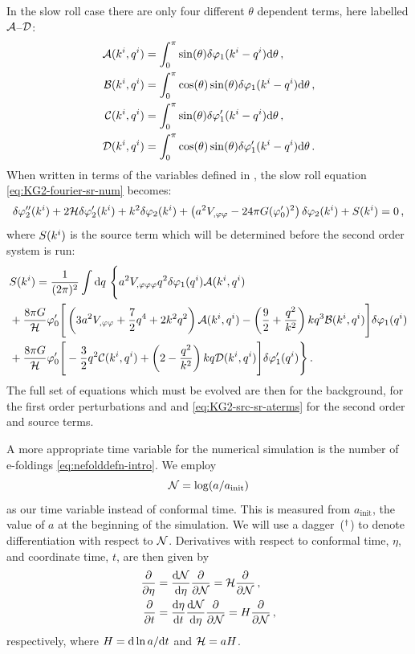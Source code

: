 In the slow roll case there are only four different $\theta$ dependent terms,
here labelled $\mathcal{A}$--$\mathcal{D}$:
%
\begin{align}
\label{eq:AtoD-num}
 \mathcal{A}(k^i,q^i) &= \int_0^\pi \sin(\theta) \delta\varphi_{1}(k^i-q^i) \mathrm{d}\theta \,,
\nonumber\\
 \mathcal{B}(k^i,q^i) &= \int_0^\pi \cos(\theta)\sin(\theta) \delta\varphi_{1}(k^i-q^i)
\mathrm{d}\theta \,,\nonumber\\
 \mathcal{C}(k^i,q^i) &= \int_0^\pi \sin(\theta) \delta\varphi_{1}'(k^i-q^i) \mathrm{d}\theta \,,
\nonumber\\
 \mathcal{D}(k^i,q^i) &= \int_0^\pi \cos(\theta) \sin(\theta) \delta\varphi_{1}'(k^i-q^i)
\mathrm{d}\theta \,.
\end{align}
%
When written in terms of the variables defined in ,
the slow roll equation
\eqref{eq:KG2-fourier-sr-num} becomes:
%
\begin{equation}
\label{eq:KG2-fourier-sr-aterms}
\delta\varphi_{2}''(k^i)+2\mathcal{H}\delta\varphi_{2}'(k^i)+k^2\delta\varphi_{2}(k^i)
+\left(a^2
V_{,\varphi\varphi}-{24 \pi G}(\varphi_{0}')^2\right)
\delta\varphi_{2}(k^i)
+ S(k^i) = 0 \,,
\end{equation}
%
where $S(k^i)$ is the source term which will be determined before the
second order system is run:
\begin{align}
\label{eq:KG2-src-sr-aterms}
&S(\kvi) = \frac{1}{(2\pi)^2}\int \d q\ \Bigg\{
a^2\Uppp q^2 \dvp1(\qvi) \A(\kvi,\qvi) \nonumber\\
&+ \frac{8\pi G}{\H}\vp_{0}' \Bigg[ 
\left( 3a^2\Upp + \frac{7}{2}q^4 + 2k^2q^2\right) \A(\kvi,\qvi)
-\left(\frac{9}{2} + \frac{q^2}{k^2}\right)kq^3 \B(\kvi,\qvi)
\Bigg]\dvp1(\qvi) \nonumber\\
%
&+ \frac{8\pi G}{\H}\vp_{0}' \Bigg[
-\frac{3}{2}q^2 \C(\kvi,\qvi) + \left(2-\frac{q^2}{k^2}\right)kq \D(\kvi,\qvi) 
\Bigg]\dvp1'(\qvi) \Bigg\} \,.
%
\end{align}
%
 The full set of equations which must be evolved are
then  for the background,  for the first
order perturbations and  and
\eqref{eq:KG2-src-sr-aterms} for the second order and source terms.


A more appropriate time variable for the numerical simulation is the
number of e-foldings \eqref{eq:nefolddefn-intro}. We employ 
%
\begin{equation}
\label{eq:def-ntime}
\mathcal{N} = \log ( a / a_{\mathrm{init}} )
\end{equation}
%
as our time variable instead of conformal time. This is measured from
$a_{\mathrm{init}}$, the value of $a$ at the beginning of the
simulation. We will use a dagger\footnotemark\ ($^{\dagger}$) to denote differentiation
with respect to $\mathcal{N}$.
% 
Derivatives with respect to conformal time, $\eta$, and coordinate time, $t$, are
then given by
%
\begin{align}
 \frac{\partial  }{\partial \eta} &= \frac{\mathrm{d} \mathcal{N}}{\mathrm{d} \eta}\frac{\partial }{\partial \mathcal{N}} = \mathcal{H} \frac{\partial }{\partial \mathcal{N}} \,,\\
 \frac{\partial  }{\partial t} &= \frac{\mathrm{d} \eta}{\mathrm{d} t} \frac{\mathrm{d} \mathcal{N}}{\mathrm{d} \eta}\frac{\partial }{\partial \mathcal{N}} = H
\frac{\partial }{\partial \mathcal{N}}\,,
\end{align}
%
respectively, where $H = \mathrm{d} \ln a/\mathrm{d} t$ and $\mathcal{H} = aH$.
% 

